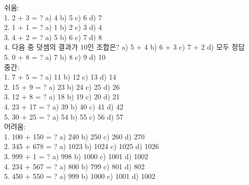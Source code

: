 \documentclass[fleqn]{article}
\begin{document}
      
        쉬움: \\  
1. 2 + 3 = ?  
   a) 4  
   b) 5  
   c) 6  
   d) 7 \\  
2. 1 + 1 = ?  
   a) 1  
   b) 2  
   c) 3  
   d) 4 \\  
3. 4 + 2 = ?  
   a) 5  
   b) 6  
   c) 7  
   d) 8 \\  
4. 다음 중 덧셈의 결과가 10인 조합은?  
   a) 5 + 4  
   b) 6 + 3  
   c) 7 + 2  
   d) 모두 정답 \\  
5. 0 + 8 = ?  
   a) 7  
   b) 8  
   c) 9  
   d) 10 \\  

중간: \\  
1. 7 + 5 = ?  
   a) 11  
   b) 12  
   c) 13  
   d) 14 \\  
2. 15 + 9 = ?  
   a) 23  
   b) 24  
   c) 25  
   d) 26 \\  
3. 12 + 8 = ?  
   a) 18  
   b) 19  
   c) 20  
   d) 21 \\  
4. 23 + 17 = ?  
   a) 39  
   b) 40  
   c) 41  
   d) 42 \\  
5. 30 + 25 = ?  
   a) 54  
   b) 55  
   c) 56  
   d) 57 \\  

어려움: \\  
1. 100 + 150 = ?  
   a) 240  
   b) 250  
   c) 260  
   d) 270 \\  
2. 345 + 678 = ?  
   a) 1023  
   b) 1024  
   c) 1025  
   d) 1026 \\  
3. 999 + 1 = ?  
   a) 998  
   b) 1000  
   c) 1001  
   d) 1002 \\  
4. 234 + 567 = ?  
   a) 800  
   b) 799  
   c) 801  
   d) 802 \\  
5. 450 + 550 = ?  
   a) 999  
   b) 1000  
   c) 1001  
   d) 1002 \\  

      
        
\end{document}
